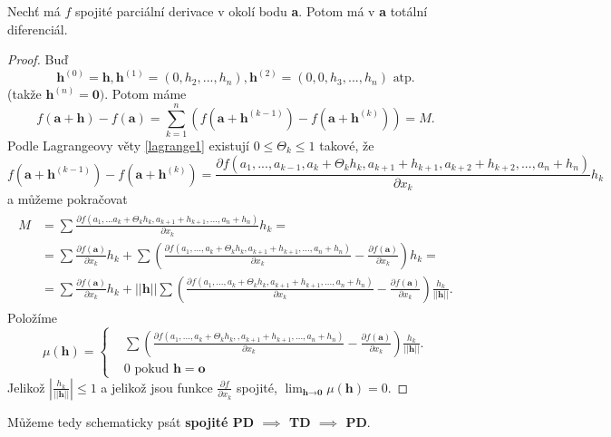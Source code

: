\documentclass[../main.tex]{subfiles}
\begin{document}
\begin{theorem}
	Nechť má $f$ spojité parciální derivace v okolí bodu \textbf{a}. Potom má v \textbf{a} totální diferenciál.
\end{theorem}

\begin{proof}
	Buď
	\[\textbf{h}^{(0)} = \textbf{h}, \textbf{h}^{(1)} = (0, h_2,...,h_n), \textbf{h}^{(2)} = (0,0,h_3,...,h_n) \textrm{ atp.} \]
	(takže $\textbf{h}^{(n)} = \textbf{0})$.
	Potom máme
	\[f(\textbf{a}+\textbf{h}) - f(\textbf{a}) = \sum^n_{k=1}(f(\textbf{a}+\textbf{h}^{(k-1)})-f(\textbf{a}+\textbf{h}^{(k)})) = M.\]
	Podle Lagrangeovy věty \ref{lagrange1} existují $0 \leq \Theta_k \leq 1$ takové, že
	\[f(\textbf{a}+\textbf{h}^{(k-1)})-f(\textbf{a}+\textbf{h}^{(k)}) = \frac{\partial f(a_1,...,a_{k-1},a_k+ \Theta_kh_k,a_{k+1}+h_{k+1}, a_{k+2}+h_{k+2},...,a_n+h_n)}{\partial x_k}h_k\]
	a můžeme pokračovat
	\begin{align*} 
		\begin{split}
			M & = \sum\frac{\partial f(a_1,...a_k+\Theta_kh_k, a_{k+1}+h_{k+1},...,a_n+h_n)}{\partial x_k}h_k = \\
			 & = \sum \frac{\partial f(\textbf{a})}{\partial x_k}h_k + \sum \left( \frac{\partial f(a_1,...,a_k+\Theta_kh_k, a_{k+1}+h_{k+1},...,a_n+h_n)}{\partial x_k}
			 - \frac{\partial f(\textbf{a})}{\partial x_k} \right)h_k = \\
			 & = \sum \frac{\partial f(\textbf{a})}{\partial x_k}h_k + ||\textbf{h}||\sum\left(\frac{\partial f(a_1,...,a_k+\Theta_kh_k, a_{k+1}+h_{k+1},...,a_n+h_n)}
			 {\partial x_k}- \frac{\partial f(\textbf{a})}{\partial x_k}\right)\frac{h_k}{||\textbf{h}||}.
		\end{split}
	\end{align*}
	Položíme
	\[\mu (\textbf{h}) =
	    \begin{cases} & \sum\left(\frac{\partial f(a_1,...,a_k+\Theta_kh_k,, a_{k+1}+h_{k+1},...,a_n+h_n)}{\partial x_k} -
	    \frac{\partial f(\textbf{a})}{\partial x_k} \right)\frac{h_k}{||\textbf{h}||}.\\
	    & 0 \text{ pokud } \mathbf{h} = \mathbf{o}
	    \end{cases}\]
	Jelikož $\left|\frac{h_k}{||\textbf{h}||}\right| \leq 1$ a jelikož jsou funkce $\frac{\partial f}{\partial x_k}$ spojité,
	$\lim_{\textbf{h}\rightarrow \textbf{0}} \mu (\textbf{h}) = 0$.
\end{proof}

\begin{consequence}
	Můžeme tedy schematicky psát \textbf{spojité PD $\implies$ TD $\implies$ PD}.
\end{consequence}
\end{document}
